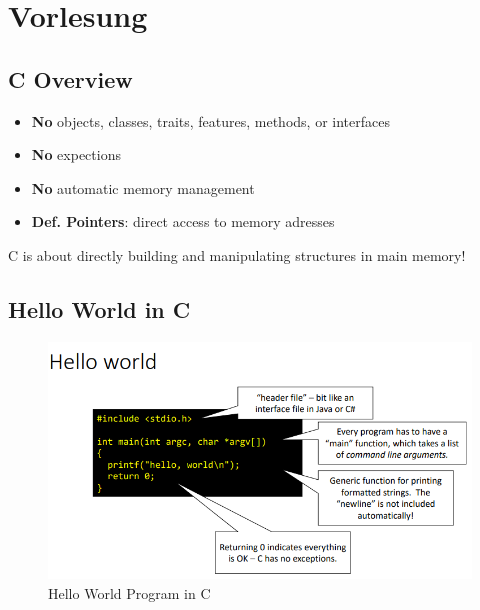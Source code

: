 \documentclass[a4paper,10pt]{article}
\begin{document}
\section{Vorlesung}
\subsection{C Overview}
\begin{itemize}
    \item \textbf{No} objects, classes, traits, features, methods, or interfaces
    \item \textbf{No} expections
    \item \textbf{No} automatic memory management
    \item \textbf{Def. Pointers}: direct access to memory adresses
\end{itemize}
C is about directly building and manipulating structures in main
memory!\\ 
\subsection{Hello World in C}
\begin{figure}[htp]
    \centering
    \includegraphics[width=1\linewidth]{Pictures/e3.png}
    \caption{Hello World Program in C}
\end{figure}
\end{document}
